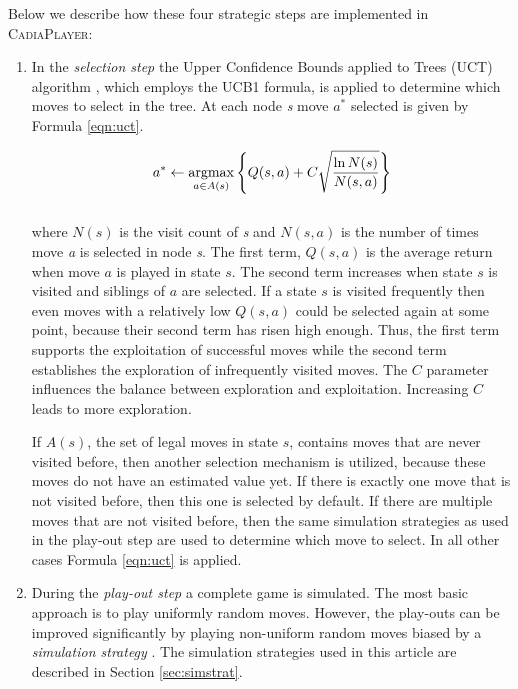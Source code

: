 \documentclass[journal]{IEEEtran}
\newcommand{\argmax}{\operatornamewithlimits{argmax}}
\begin{document}
Below we describe how these four strategic steps are implemented in \textsc{CadiaPlayer}:
\begin{enumerate}

\item In the \textit{selection step} the Upper Confidence Bounds applied to Trees (UCT) algorithm \cite{mctsBandit}, which employs the UCB1 \cite{UCB1} formula, is applied to determine which moves to select in the tree. At each node \textit{s} move $a^*$ selected is given by Formula \ref{eqn:uct}.

\begin{equation}
\label{eqn:uct}
a^* \leftarrow \argmax_{a \in A(s)} \left\{ Q(s,a) + C \sqrt{ \frac{\ln{N(s)}}{N(s,a)} }\right\}
\end{equation}
\\
where $N(s)$ is the visit count of \textit{s} and $N(s,a)$ is the number of times move \textit{a} is selected in node \textit{s}. The first term, $Q(s,a)$ is the average return when move $a$ is played in state $s$. The second term increases when state $s$ is visited and siblings of $a$ are selected. If a state $s$ is visited frequently then even moves with a relatively low $Q(s,a)$ could be selected again at some point, because their second term has risen high enough. Thus, the first term supports the exploitation of successful moves while the second term establishes the exploration of infrequently visited moves. The $C$ parameter influences the balance between exploration and exploitation. Increasing $C$ leads to more exploration.

If $A(s)$, the set of legal moves in state $s$, contains moves that are never visited before, then another selection mechanism is utilized, because these moves do not have an estimated value yet. If there is exactly one move that is not visited before, then this one is selected by default. If there are multiple moves that are not visited before, then the same simulation strategies as used in the play-out step are used to determine which move to select.
In all other cases Formula \ref{eqn:uct} is applied.


\item During the \textit{play-out step} a complete game is simulated. The most basic approach is to play uniformly random moves. However, the play-outs can be improved significantly by playing non-uniform random moves biased by a \textit{simulation strategy} \cite{Gelly:2007}. The simulation strategies used in this article are described in Section \ref{sec:simstrat}.


\end{enumerate}
\end{document}
